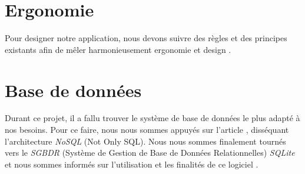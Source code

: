 \section{Ergonomie}
Pour designer notre application, nous devons suivre des règles et des principes existants afin de mêler harmonieusement ergonomie et design \cite{lente2014scenariser}.

\section{Base de données}

Durant ce projet, il a fallu trouver le système de base de données le plus adapté à nos besoins. Pour ce faire, nous nous sommes appuyés sur l'article \cite{strauchnosql}, disséquant l'architecture \textit{NoSQL} (Not Only SQL).
Nous nous sommes finalement tournés vers le \textit{SGBDR} (Système de Gestion de Base de Données Relationnelles) \textit{SQLite} et nous sommes informés sur l'utilisation et les finalités de ce logiciel \cite{kreibich2010using}.

